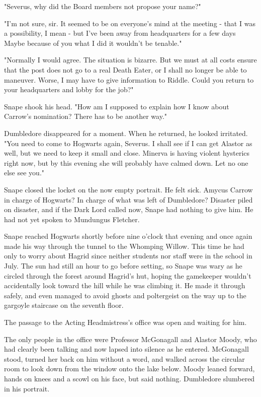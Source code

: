 "Severus, why did the Board members not propose your name?"

"I'm not sure, sir. It seemed to be on everyone's mind at the meeting - that I was a possibility, I mean - but I've been away from headquarters for a few days{\el} Maybe because of you{\el} what I did{\el} it wouldn't be tenable."

"Normally I would agree. The situation is bizarre. But we must at all costs ensure that the post does not go to a real Death Eater, or I shall no longer be able to maneuver. Worse, I may have to give information to Riddle. Could you return to your headquarters and lobby for the job?"

Snape shook his head. "How am I supposed to explain how I know about Carrow's nomination? There has to be another way."

Dumbledore disappeared for a moment. When he returned, he looked irritated. "You need to come to Hogwarts again, Severus. I shall see if I can get Alastor as well, but we need to keep it small and close. Minerva is having violent hysterics right now, but by this evening she will probably have calmed down. Let no one else see you."

Snape closed the locket on the now empty portrait. He felt sick. Amycus Carrow in charge of Hogwarts? In charge of what was left of Dumbledore? Disaster piled on disaster, and if the Dark Lord called now, Snape had nothing to give him. He had not yet spoken to Mundungus Fletcher.

Snape reached Hogwarts shortly before nine o'clock that evening and once again made his way through the tunnel to the Whomping Willow. This time he had only to worry about Hagrid since neither students nor staff were in the school in July. The sun had still an hour to go before setting, so Snape was wary as he circled through the forest around Hagrid's hut, hoping the gamekeeper wouldn't accidentally look toward the hill while he was climbing it. He made it through safely, and even managed to avoid ghosts and poltergeist on the way up to the gargoyle staircase on the seventh floor.

The passage to the Acting Headmistress's office was open and waiting for him.

The only people in the office were Professor McGonagall and Alastor Moody, who had clearly been talking and now lapsed into silence as he entered. McGonagall stood, turned her back on him without a word, and walked across the circular room to look down from the window onto the lake below. Moody leaned forward, hands on knees and a scowl on his face, but said nothing. Dumbledore slumbered in his portrait.


